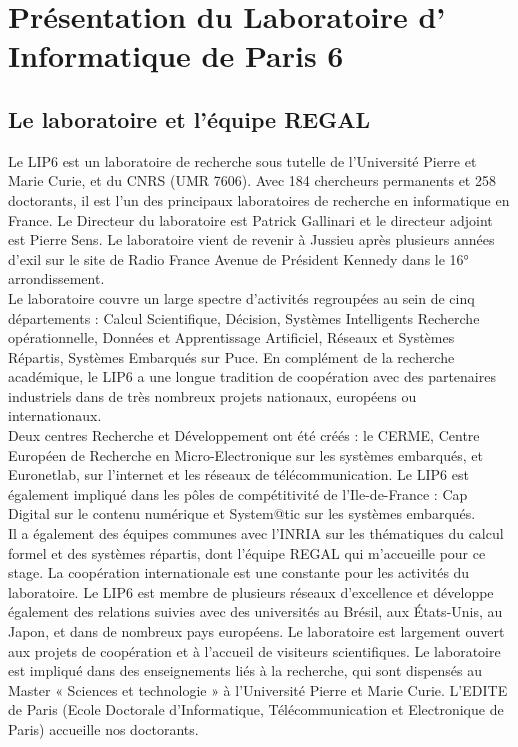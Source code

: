 \section{Présentation du Laboratoire d' Informatique de Paris 6}
	\subsection{Le laboratoire et l'équipe REGAL}
	\par Le LIP6 est un laboratoire de recherche sous tutelle de l'Université Pierre et Marie Curie, et du CNRS (UMR 7606). Avec 184 chercheurs permanents et 258 doctorants, il est l'un des principaux laboratoires de recherche en informatique en France. Le Directeur du laboratoire est Patrick Gallinari et le directeur adjoint est Pierre Sens. Le laboratoire vient de revenir à Jussieu après plusieurs années d'exil sur le site de Radio France Avenue de Président Kennedy dans le 16° arrondissement.\\
	Le laboratoire couvre un large spectre d'activités regroupées au sein de cinq départements : Calcul Scientifique, Décision, Systèmes Intelligents Recherche opérationnelle, Données et Apprentissage Artificiel, Réseaux et Systèmes Répartis, Systèmes Embarqués sur Puce. En complément de la recherche académique, le LIP6 a une longue tradition de coopération avec des partenaires industriels dans de très nombreux projets nationaux, européens ou internationaux.\\ Deux centres Recherche et Développement  ont été créés : le CERME, Centre Européen de Recherche en Micro-Electronique sur les systèmes embarqués, et Euronetlab, sur l'internet et les réseaux de télécommunication. Le LIP6 est également impliqué dans les pôles de compétitivité de l'Ile-de-France : Cap Digital sur le contenu numérique et System@tic sur les systèmes embarqués.\\
	Il a également des équipes communes avec l'INRIA sur les thématiques du calcul formel et des systèmes répartis, dont l'équipe REGAL qui m'accueille pour ce stage. La coopération internationale est une constante pour les activités du laboratoire. Le LIP6 est membre de plusieurs réseaux d'excellence et développe également des relations suivies avec des universités au Brésil, aux États-Unis, au Japon, et dans de nombreux pays européens. Le laboratoire est largement ouvert aux projets de coopération et à l'accueil de visiteurs scientifiques. Le laboratoire est impliqué dans des enseignements liés à la recherche, qui sont dispensés au Master « Sciences et technologie » à l'Université Pierre et Marie Curie. L'EDITE de Paris (Ecole Doctorale d'Informatique, Télécommunication et Electronique de Paris) accueille nos doctorants.\\

